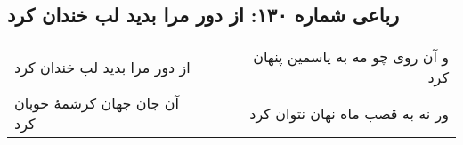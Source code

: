 \begin{center}
\section*{رباعی شماره ۱۳۰: از دور مرا بدید لب خندان کرد}
\label{sec:sh130}
\begin{longtable}{l p{0.5cm} r}
از دور مرا بدید لب خندان کرد
&&
و آن روی چو مه به یاسمین پنهان کرد
\\
آن جان جهان کرشمهٔ خوبان کرد
&&
ور نه به قصب ماه نهان نتوان کرد
\\
\end{longtable}
\end{center}
